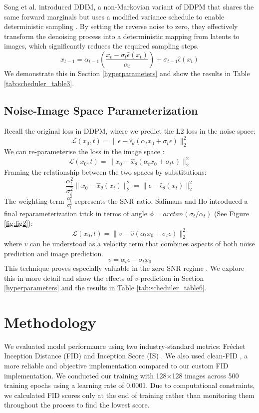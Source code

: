 \documentclass[conference]{IEEEtran}
\begin{document}
Song et al. introduced DDIM, a non-Markovian variant of DDPM that shares the same forward marginals but uses a modified variance schedule to enable deterministic sampling \cite{songDenoisingDiffusionImplicit2022}. By setting the reverse noise to zero, they effectively transform the denoising process into a deterministic mapping from latents to images, which significantly reduces the required sampling steps.
$$x_{t-1} = \alpha_{t-1}\left(\frac{x_t - \sigma_t\hat{\epsilon}(x_t)}{\alpha_t}\right) + \sigma_{t-1}\hat{\epsilon}(x_t) $$
We demonstrate this in Section \ref{hyperparameters} and show the results in Table \ref{tab:scheduler_table3}.

\subsection{Noise-Image Space Parameterization}\label{reparam}
Recall the original loss in DDPM, where we predict the L2 loss in the noise space:
$$
\mathcal{L}(x_0, t) = \|\epsilon - \hat{\epsilon}_\theta(\alpha_t x_0 + \sigma_t \epsilon)\|_2^2
$$
We can re-parameterise the loss in the image space \cite{nicholImprovedDenoisingDiffusion2021}:
$$
\mathcal{L}(x_0, t) = \|x_0 - \hat{x}_\theta(\alpha_t x_0 + \sigma_t \epsilon)\|_2^2
$$
Framing the relationship between the two spaces by substitutions:
$$
\frac{\alpha_t^2}{\sigma_t^2} \|x_0 - \hat{x}_\theta(x_t)\|_2^2 = \|\epsilon - \hat{\epsilon}_\theta(x_t)\|_2^2
$$
The weighting term $\frac{\alpha_t^2}{\sigma_t^2}$  represents the SNR ratio. Salimans and Ho \cite{salimansProgressiveDistillationFast2022} introduced a final reparameterization trick in terms of angle $\phi = arctan(\sigma_t/ \alpha_t)$ (See Figure \ref{fig:fig2}):
$$\mathcal{L}(x_0, t) = \|v - \hat{v}(\alpha_t x_0 + \sigma_t \epsilon)\|_2^2$$
where $v$ can be understood as a velocity term that combines aspects of both noise prediction and image prediction.
$$
 v = \alpha_t \epsilon - \sigma_tx_0
$$
This technique proves especially valuable in the zero SNR regime \cite{linCommonDiffusionNoise2024}. We explore this in more detail and show the effects of $v$-prediction in Section \ref{hyperparameters} and the results in Table \ref{tab:scheduler_table6}.

\section{Methodology} \label{methodology}

We evaluated model performance using two industry-standard metrics: Fréchet Inception Distance (FID) \cite{heuselGANsTrainedTwo2018} and Inception Score (IS) \cite{salimansImprovedTechniquesTraining2016}. We also used clean-FID \cite{parmarAliasedResizingSurprising2022}, a more reliable and objective implementation compared to our custom FID implementation. We conducted our training with 128×128 images across 500 training epochs using a learning rate of 0.0001. Due to computational constraints, we calculated FID scores only at the end of training rather than monitoring them throughout the process to find the lowest score.
\end{document}
